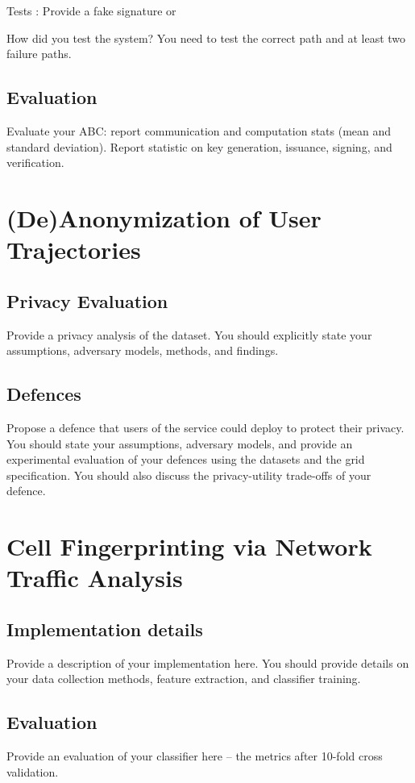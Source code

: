 \documentclass[10pt,conference,compsocconf]{IEEEtran}
\begin{document}
Tests : Provide a fake signature or 

How did you test the system?
You need to test the correct path and at least two failure paths.

\subsection{Evaluation}
Evaluate your ABC: report communication and computation stats (mean and standard
deviation). Report statistic on key generation, issuance, signing, and
verification.

\section{(De)Anonymization of User Trajectories}

\subsection{Privacy Evaluation}
Provide a privacy analysis of the dataset. You should explicitly state your assumptions, adversary
models, methods, and findings.

\subsection{Defences}
Propose a defence that users of the service could deploy to protect their privacy.  You
should state your assumptions, adversary models, and provide an experimental evaluation of your
defences using the datasets and the grid specification. You should also discuss the
privacy-utility trade-offs of your defence.

\section{Cell Fingerprinting via Network Traffic Analysis}

\subsection{Implementation details}
Provide a description of your implementation here. You should provide details on your data collection methods, feature extraction, and classifier training.

\subsection{Evaluation}
Provide an evaluation of your classifier here -- the metrics after 10-fold cross validation.
\end{document}
